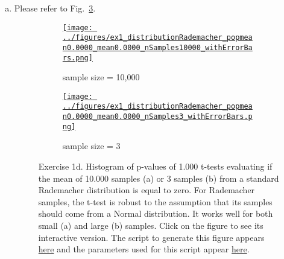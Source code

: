 \documentclass[12pt]{article}
\def\fig_width{3.5in}
\begin{document}
\begin{enumerate}[(a)]
    \item  Please refer to Fig.~\ref{fig:ex1d}.

        \begin{figure}[H]
            \begin{center}

                \begin{subfigure}{1.0\textwidth}
                    \centering
                    \href{https://www.gatsby.ucl.ac.uk/~rapela/neuroinformatics/2023/ws1/figures/ex1_distributionRademacher_popmean0.0000_mean0.0000_nSamples10000_withErrorBars.html}{\texttt{[image: ../figures/ex1\_distributionRademacher\_popmean0.0000\_mean0.0000\_nSamples10000\_withErrorBars.png]}}

                    \caption{sample size = 10,000}

                    \label{fig:ex1d_1}
                \end{subfigure}

                \begin{subfigure}{1.0\textwidth}
                    \centering
                    \href{https://www.gatsby.ucl.ac.uk/~rapela/neuroinformatics/2023/ws1/figures/ex1_distributionRademacher_popmean0.0000_mean0.0000_nSamples3_withErrorBars.html}{\texttt{[image: ../figures/ex1\_distributionRademacher\_popmean0.0000\_mean0.0000\_nSamples3\_withErrorBars.png]}}

                    \caption{sample size = 3}

                    \label{fig:ex1d_2}
                \end{subfigure}

                \caption{Exercise 1d. Histogram of p-values of 1.000 t-tests
                evaluating if the mean of 10.000 samples (a) or 3 samples (b)
                from a standard Rademacher distribution is equal to zero.  For
                Rademacher samples, the t-test is robust to the assumption that
                its samples should come from a Normal distribution. It works
                well for both small (a) and large (b) samples. Click on the
                figure to see its interactive version.  The script to generate
                this figure appears
                \href{https://github.com/joacorapela/neuroinformatics23/blob/master/worksheets/ws1/mySolution/code/scripts/doEx1WithErrorBars.py}{here}
                and the parameters used for this script appear
                \href{https://github.com/joacorapela/neuroinformatics23/blob/master/worksheets/ws1/mySolution/code/scripts/doEx1dWithErrorBars.csh}{here}.}
                \label{fig:ex1d}


\end{center}
\end{figure}
\end{enumerate}
\end{document}
